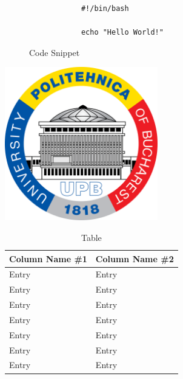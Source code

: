\begin{frame}[fragile]
    \begin{figure}[!ht]
        \centering
        \tiny
        \begin{minipage}{0.7\textwidth}
            \begin{verbatim}
            #!/bin/bash
    
            echo "Hello World!"
            \end{verbatim}
        \end{minipage}
        \caption{Code Snippet}
    \end{figure}
\end{frame}

\begin{frame}
    \includegraphics[width=0.5\textwidth, center]{images/theme/upb.png}
    \captionsetup{justification=centering,margin=1cm}
\end{frame}

\begin{frame}

    \begin{table}[]
        \centering
        \begin{tabular}{|l|l|}
            \hline
            Column Name \#1 & Column Name \#2 \\ \hline
            Entry           & Entry           \\ \hline
            Entry           & Entry           \\ \hline
            Entry           & Entry           \\ \hline
            Entry           & Entry           \\ \hline
            Entry           & Entry           \\ \hline
            Entry           & Entry           \\ \hline
            Entry           & Entry           \\ \hline
        \end{tabular}
        \caption{Table}
        \label{tab:table}
    \end{table}

\end{frame}